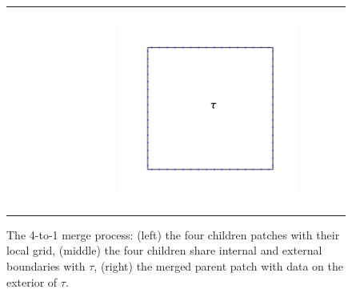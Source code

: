 \begin{figure}
\begin{tabular}{ccc}
\begin{subfigure}[t]{0.3\textwidth}
            \label{subfig:4_patches}
        \end{subfigure}
        &
        \begin{subfigure}[t]{0.3\textwidth}
            \centering
            \includegraphics[width=\textwidth, clip=true, trim={100 150 100 150}]{../figures/merged_patch.pdf}
            \label{subfig:parent_patch}
        \end{subfigure}
    \end{tabular}
    \caption{The 4-to-1 merge process: (left) the four children patches with their local grid, (middle) the four children share internal and external boundaries with $\tau$, (right) the merged parent patch with data on the exterior of $\tau$.}
    \label{fig:4_to_1_patches}
\end{figure}



